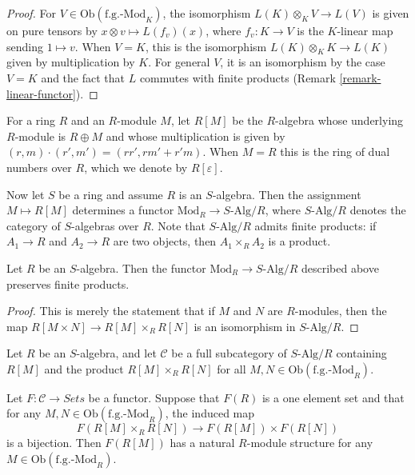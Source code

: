 \begin{proof}
For $V \in \text{Ob}(\text{f.g.-Mod}_{K})$, the isomorphism $L(K) 
\otimes_{K} V \to L(V)$ is given on pure tensors by $x \otimes v 
\mapsto L(f_{v})(x)$, where $f_{v}: K \to V$ is the $K$-linear map 
sending $1 \mapsto v$.  When $V = K$, this is the isomorphism $L(K) \otimes_{K} 
K \to L(K)$ given by multiplication by $K$.  For general $V$, it is an 
isomorphism by the case $V = K$ and the fact that $L$ commutes with finite 
products (Remark \ref{remark-linear-functor}).
\end{proof}

\noindent 
For a ring $R$ and an $R$-module $M$, let $R[M]$ be the $R$-algebra whose 
underlying $R$-module is $R \oplus M$ and whose multiplication is given by 
$(r,m) \cdot (r',m') = (rr', rm' + r'm)$.  When $M = R$ this is the ring of 
dual numbers over $R$, which we denote by $R[\varepsilon]$.  

\medskip \noindent
Now let $S$ be a ring and assume $R$ is an $S$-algebra.  Then the assignment $M 
\mapsto R[M]$ determines a functor $\text{Mod}_{R} \to S 
\text{-Alg}/R$, where $S \text{-Alg}/R$ denotes the category of 
$S$-algebras over $R$.  Note that $S \text{-Alg}/R$ admits finite 
products: if $A_1 \to R$ and $A_2 \to R$ are two objects, then 
$A_1 \times_{R} A_2$ is a product.

\begin{lemma}
\label{lemma-preserves-products}
Let $R$ be an $S$-algebra. Then the functor $\text{Mod}_{R} \to S 
\text{-Alg}/R$ described above preserves finite products.
\end{lemma}

\begin{proof}
This is merely the statement that if $M$ and $N$ are $R$-modules, then the map 
$R[M \times N] \to R[M] \times_{R} R[N]$ is an isomorphism in $S 
\text{-Alg}/R$.
\end{proof}

\begin{lemma}
\label{lemma-tangent-space-functor}
Let $R$ be an $S$-algebra, and let $\mathcal{C}$ be a full subcategory of $S 
\text{-Alg}/R$ containing $R[M]$ and the product $R[M] \times_{R} R[N]$ 
for all $M,N \in \text{Ob}(\text{f.g.-Mod}_{R})$.  

\smallskip \noindent
Let $F: \mathcal{C} \to \textit{Sets}$ be a functor.  Suppose that 
$F(R)$ is a one element set and that for any $M, N \in 
\text{Ob}(\text{f.g.-Mod}_{R})$, the induced map 
\[ F(R[M] \times_{R} R[N]) \to F(R[M]) \times F(R[N])\]
is a bijection.  Then $F(R[M])$ has a natural $R$-module structure for any $M 
\in \text{Ob}(\text{f.g.-Mod}_{R})$.
\end{lemma}

